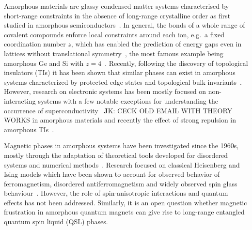 Amorphous materials are glassy condensed matter systems characterised by
short-range constraints in the absence of long-range crystalline order
as first studied in amorphous
semiconductors~\autocite{Yonezawa1983,zallen2008physics}. In general,
the bonds of a whole range of covalent compounds enforce local
constraints around each ion, e.g.~a fixed coordination number \(z\),
which has enabled the prediction of energy gaps even in lattices without
translational symmetry~\autocite{Weaire1976,gaskell1979structure}, the
most famous example being amorphous Ge and Si with
\(z=4\)~\autocite{Weaire1971,betteridge1973possible}. Recently,
following the discovery of topological insulators (TIs) it has been
shown that similar phases can exist in amorphous systems characterized
by protected edge states and topological bulk
invariants~\autocite{mitchellAmorphousTopologicalInsulators2018,agarwala2019topological,marsalTopologicalWeaireThorpeModels2020,costa2019toward,agarwala2020higher,spring2021amorphous,corbae2019evidence}.
However, research on electronic systems has been mostly focused on
non-interacting systems with a few notable exceptions for understanding
the occurrence of
superconductivity~\autocite{buckel1954einfluss,mcmillan1981electron,bergmann1976amorphous}
\(\textbf{J}\)K: CECK OLD EMAIL WITH THEORY WORKS in amorphous materials
and recently the effect of strong repulsion in amorphous
TIs~\autocite{kim2022fractionalization}.

Magnetic phases in amorphous systems have been investigated since the
1960s, mostly through the adaptation of theoretical tools developed for
disordered systems
\autocite{aharony1975critical,Petrakovski1981,kaneyoshi1992introduction,Kaneyoshi2018}
and numerical methods~\autocite{fahnle1984monte,plascak2000ising}.
Research focused on classical Heisenberg and Ising models which have
been shown to account for observed behavior of ferromagnetism,
disordered antiferromagnetism and widely observed spin glass
behaviour~\autocite{coey1978amorphous}. However, the role of
spin-anisotropic interactions and quantum effects has not been
addressed. Similarly, it is an open question whether magnetic
frustration in amorphous quantum magnets can give rise to long-range
entangled quantum spin liquid (QSL) phases.

